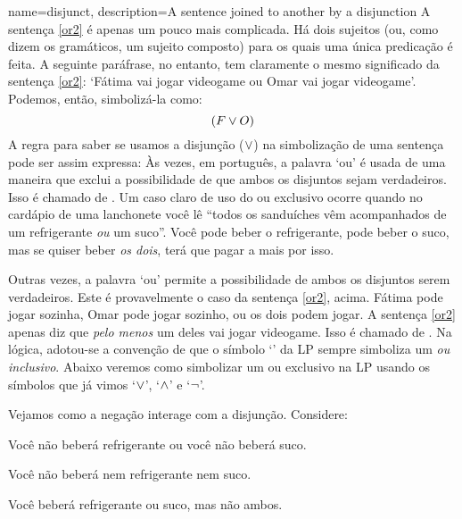 {
name=disjunct,
description={A sentence joined to another by a \gls{disjunction}}
}
A sentença \ref{or2} é apenas um pouco mais complicada.
Há dois sujeitos (ou, como dizem os gramáticos, um sujeito composto) para os quais uma única predicação é feita.
A seguinte paráfrase, no entanto, tem claramente o mesmo significado da sentença  \ref{or2}:
`Fátima vai jogar videogame ou Omar vai jogar videogame'.
Podemos, então, simbolizá-la como:
$$(F \vee O)$$
A regra para saber se usamos a disjunção ($\vee$) na simbolização de uma sentença pode ser assim expressa:
Às vezes, em português, a palavra `ou' é usada de uma maneira que exclui a possibilidade de que ambos os disjuntos sejam verdadeiros.
Isso é chamado de .
Um caso claro de uso do ou exclusivo ocorre quando no cardápio de uma lanchonete você lê ``todos os sanduíches vêm acompanhados de um refrigerante \emph{ou} um suco''.
Você pode beber o refrigerante, pode beber o suco, mas se quiser beber \emph{os dois}, terá que pagar a mais por isso.

Outras vezes, a palavra `ou' permite a possibilidade de ambos os disjuntos serem verdadeiros.
Este é provavelmente o caso da sentença \ref{or2}, acima.
Fátima pode jogar sozinha, Omar pode jogar sozinho, ou os dois podem jogar.
A sentença \ref{or2} apenas diz que \emph{pelo menos} um deles vai jogar videogame. Isso é chamado de .
Na lógica, adotou-se a convenção de que o símbolo `\eor' da LP sempre simboliza um \emph{ou inclusivo}.
Abaixo veremos como simbolizar um ou exclusivo na LP usando os símbolos que já vimos `$\vee$', `$\wedge$' e `$\neg$'.

Vejamos como a negação interage com a disjunção. Considere:
	\begin{earg}
		\item[\ex{or3}] Você não beberá refrigerante ou você não beberá suco.
		\item[\ex{or4}] Você não beberá nem refrigerante nem suco.
		\item[\ex{or.xor}] Você beberá refrigerante ou suco, mas não ambos.
	\end{earg}

